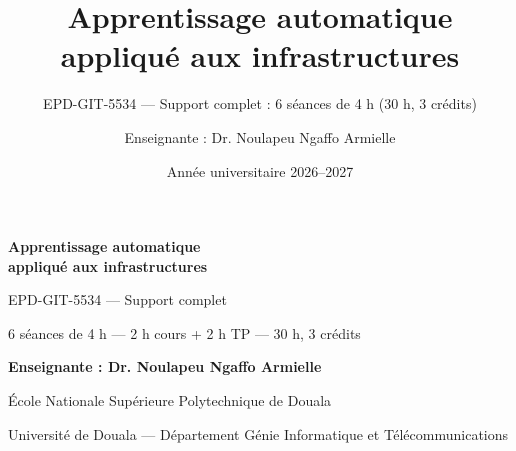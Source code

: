 
\title[EPD-GIT-5534 --- Support complet]{Apprentissage automatique appliqué aux infrastructures}
\subtitle{EPD-GIT-5534 --- Support complet : 6 séances de 4 h (30 h, 3 crédits)}
\author{Enseignante : Dr. Noulapeu Ngaffo Armielle}
\date{Année universitaire 2026--2027}

\begin{frame}[plain]
\vspace{0.9cm}
\begin{center}
{\color{white}\bfseries\LARGE Apprentissage automatique\\[1mm] appliqué aux infrastructures\par}
\vspace{.35cm}
{\color{byCyan}\large EPD-GIT-5534 --- Support complet\par}
\vspace{.5cm}
{\color{white!85}\small 6 séances de 4 h --- 2 h cours + 2 h TP --- 30 h, 3 crédits\par}
\vspace{.55cm}
{\color{byCyan}\bfseries\normalsize Enseignante : Dr. Noulapeu Ngaffo Armielle\par}
\vspace{.1cm}
{\color{white!80}\footnotesize École Nationale Supérieure Polytechnique de Douala\par}
{\color{white!65}\footnotesize Université de Douala --- Département Génie Informatique et Télécommunications\par}
\end{center}
\end{frame}
